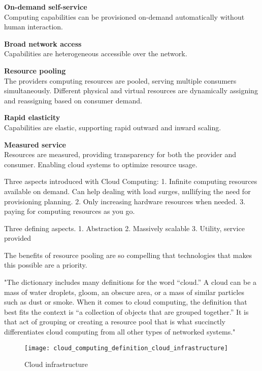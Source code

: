 \textbf{On-demand self-service}\\
Computing capabilities can be provisioned on-demand automatically without human interaction.


\textbf{Broad network access}\\
Capabilities are heterogeneous accessible over the network.


\textbf{Resource pooling}\\
The providers computing resources are pooled, serving multiple consumers simultaneously. Different physical and virtual resources are dynamically assigning and reassigning based on consumer demand.

\textbf{Rapid elasticity}\\
Capabilities are elastic, supporting rapid outward and inward scaling. 


\textbf{Measured service}\\
Resources are measured, providing transparency for both the provider and consumer. Enabling cloud systems to optimize resource usage.


Three aspects introduced with Cloud Computing: \cite{armbrust2010view}
1. Infinite computing resources available on demand. Can help dealing with load surges, nullifying the need for provisioning planning.
2. Only increasing hardware resources when needed.
3. paying for computing resources as you go.

Three defining aspects\cite{sosinsky2010cloud}.
1. Abstraction
2. Massively scalable
3. Utility, service provided

The benefits of resource pooling are so compelling that technologies that makes this possible are a priority.

"The dictionary includes many definitions for the word “cloud.” A cloud can be a mass of water droplets, gloom, an obscure area, or a mass of similar particles such as dust or smoke. When it comes to cloud computing, the definition that best fits the context is “a collection of objects that are grouped together.” It is that act of grouping or creating a resource pool that is what succinctly differentiates cloud computing from all other types of networked systems."\cite{sosinsky2010cloud}


\begin{figure}[!htb]
  \texttt{[image: cloud\_computing\_definition\_cloud\_infrastructure]}  
  \caption{Cloud infrastructure}
  \label{fig:cloud_computing_definition_cloud_infrastructure}
\end{figure}

